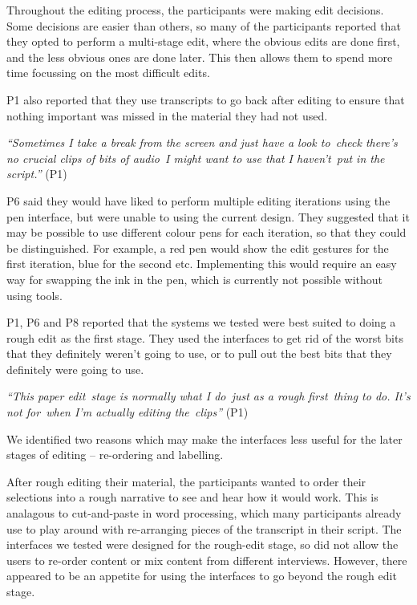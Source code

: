 Throughout the editing process, the participants were making edit decisions. Some decisions are easier than others, so
many of the participants reported that they opted to perform a multi-stage edit, where the obvious edits are done
first, and the less obvious ones are done later. This then allows them to spend more time focussing on the most
difficult edits.

P1 also reported that they use transcripts to go back after editing to ensure that nothing important was missed in the
material they had not used.

\textit{``Sometimes I take a break from the screen and just have a look to check there's no crucial clips of bits of
audio I might want to use that I haven't put in the script.''} (P1)

P6 said they would have liked to perform multiple editing iterations using the pen interface, but were unable to using
the current design. They suggested that it may be possible to use different colour pens for each iteration, so that
they could be distinguished. For example, a red pen would show the edit gestures for the first iteration, blue for the
second etc. Implementing this would require an easy way for swapping the ink in the pen, which is currently not
possible without using tools.

P1, P6 and P8 reported that the systems we tested were best suited to doing a rough edit as the first stage.  They used
the interfaces to get rid of the worst bits that they definitely weren't going to use, or to pull out the best bits
that they definitely were going to use.

\textit{``This paper edit stage is normally what I do just as a rough first thing to do. It's not for when I'm actually
editing the clips''} (P1)

We identified two reasons which may make the interfaces less useful for the later stages of editing -- re-ordering and
labelling.


After rough editing their material, the participants wanted to order their selections into a rough narrative to see and
hear how it would work. This is analagous to cut-and-paste in word processing, which many participants already use to
play around with re-arranging pieces of the transcript in their script. The interfaces we tested were designed for the
rough-edit stage, so did not allow the users to re-order content or mix content from different interviews. However,
there appeared to be an appetite for using the interfaces to go beyond the rough edit stage.

